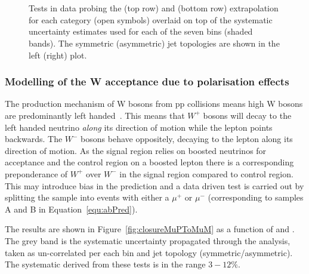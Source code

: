 \begin{figure}[h!]
  \begin{center}
    ~~
    \\
    ~~

    \caption{Tests in data probing the \alphat (top row) and \bdphi (bottom row) extrapolation for each
      \njet category (open symbols) overlaid on top of the systematic
      uncertainty estimates used for each of the seven \scalht bins (shaded bands). 
      The symmetric (asymmetric) jet topologies are shown in the left (right) plot. 
    }
    \label{fig:closureAlphaT}
  \end{center} 
\end{figure}
\subsubsection{Modelling of the W acceptance due to polarisation effects}

The production mechanism of W bosons from pp collisions means high \pt W bosons are predominantly left 
handed~\cite{lhW}. This means that $W^{+}$ bosons will decay to the left handed neutrino \emph{along}
its direction of motion while the lepton points backwards. The $W^{-}$ bosons behave oppositely, decaying
to the lepton along its direction of motion. As the signal region relies on boosted neutrinos 
for acceptance and the \mj control region on a boosted lepton there is a corresponding preponderance
of $W^{+}$ over $W^{-}$ in the signal region compared to \mj control region. This may introduce bias
in the prediction and a data driven test is carried out by splitting the \mj sample into events 
with either a $\mu^{+}$ or $\mu^{-}$ (corresponding to samples A and B in Equation~\ref{equ:abPred}).

The results are shown in Figure~\ref{fig:closureMuPToMuM} as a function of \scalht and \njet. 
The grey band is the systematic uncertainty propagated through the analysis, 
taken as un-correlated per each \scalht bin and jet topology (symmetric/asymmetric).
The systematic derived from these tests is in the range $3-12\%$.



